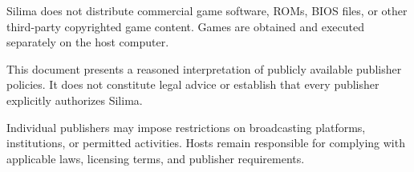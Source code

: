 Silima does not distribute commercial game software,
ROMs, BIOS files, or other third-party copyrighted
game content. Games are obtained and executed
separately on the host computer.

This document presents a reasoned interpretation of
publicly available publisher policies. It does not
constitute legal advice or establish that every
publisher explicitly authorizes Silima.

Individual publishers may impose restrictions on
broadcasting platforms, institutions, or permitted
activities. Hosts remain responsible for complying
with applicable laws, licensing terms, and publisher
requirements.
